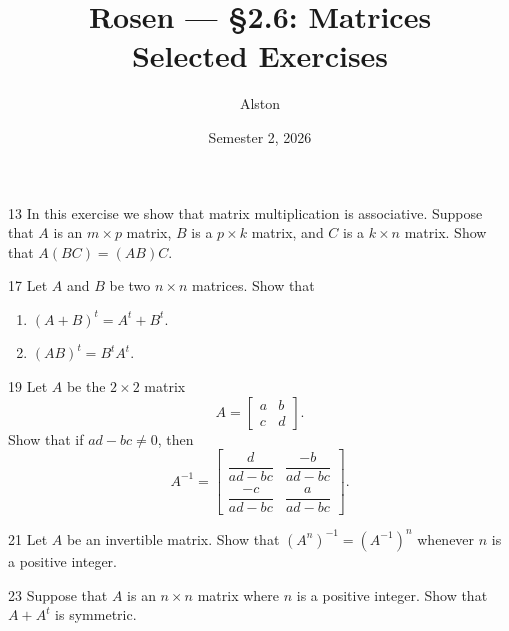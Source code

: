 \documentclass[11pt]{article}
\title{Rosen --- \S 2.6: Matrices\\ \large Selected Exercises}
\author{Alston}
\date{Semester 2, 2026}
\begin{document}
\maketitle

\begin{exercise}{13}
    In this exercise we show that matrix multiplication is associative.
    Suppose that $A$ is an $m \times p$ matrix, $B$ is a $p \times k$
    matrix, and $C$ is a $k \times n$ matrix. Show that
    $A(BC) = (AB)C$.
\end{exercise}

\begin{exercise}{17}
    Let $A$ and $B$ be two $n \times n$ matrices. Show that
    \begin{enumerate}[label=(\alph*)]
        \item $(A + B)^t = A^t + B^t$.
        \item $(AB)^t = B^t A^t$.
    \end{enumerate}
\end{exercise}

\begin{exercise}{19}
    Let $A$ be the $2 \times 2$ matrix
    \[
    A = \begin{bmatrix} a & b \\ c & d \end{bmatrix}.
    \]
    Show that if $ad - bc \neq 0$, then
    \[
    A^{-1} = \begin{bmatrix}
        \dfrac{d}{ad-bc} & \dfrac{-b}{ad-bc} \\[2ex]
        \dfrac{-c}{ad-bc} & \dfrac{a}{ad-bc}
    \end{bmatrix}.
    \]
\end{exercise}

\begin{exercise}{21}
    Let $A$ be an invertible matrix. Show that
    $(A^n)^{-1} = (A^{-1})^n$ whenever $n$ is a positive integer.
\end{exercise}

\begin{exercise}{23}
    Suppose that $A$ is an $n \times n$ matrix where $n$ is a positive
    integer. Show that $A + A^t$ is symmetric.
\end{exercise}
\end{document}
